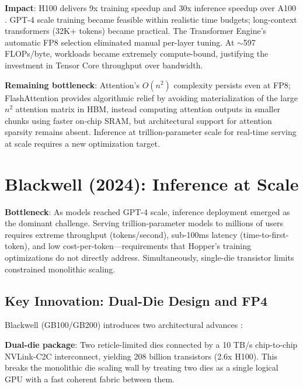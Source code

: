 \documentclass{article}
\begin{document}
\textbf{Impact}: H100 delivers 9x training speedup and 30x inference speedup over A100 \cite{nvidia2022h100performance}. GPT-4 scale training became feasible within realistic time budgets; long-context transformers (32K+ tokens) became practical. The Transformer Engine's automatic FP8 selection eliminated manual per-layer tuning. At $\sim$597 FLOPs/byte, workloads became extremely compute-bound, justifying the investment in Tensor Core throughput over bandwidth.

\textbf{Remaining bottleneck}: Attention's $O(n^2)$ complexity persists even at FP8; FlashAttention \cite{dao2022flashattention} provides algorithmic relief by avoiding materialization of the large $n^2$ attention matrix in HBM, instead computing attention outputs in smaller chunks using faster on-chip SRAM, but architectural support for attention sparsity remains absent. Inference at trillion-parameter scale for real-time serving at scale requires a new optimization target.

\section{Blackwell (2024): Inference at Scale}

\textbf{Bottleneck}: As models reached GPT-4 scale, inference deployment emerged as the dominant challenge. Serving trillion-parameter models to millions of users requires extreme throughput (tokens/second), sub-100ms latency (time-to-first-token), and low cost-per-token—requirements that Hopper's training optimizations do not directly address. Simultaneously, single-die transistor limits constrained monolithic scaling.

\subsection{Key Innovation: Dual-Die Design and FP4}

Blackwell (GB100/GB200) introduces two architectural advances \cite{nvidia2024blackwell}:

\textbf{Dual-die package}: Two reticle-limited dies connected by a 10 TB/s chip-to-chip NVLink-C2C interconnect, yielding 208 billion transistors (2.6x H100). This breaks the monolithic die scaling wall by treating two dies as a single logical GPU with a fast coherent fabric between them.
\end{document}
